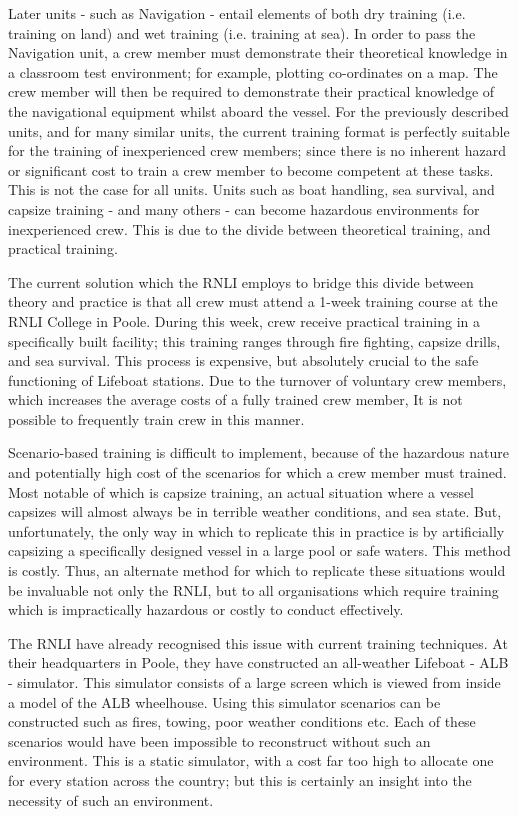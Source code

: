 \documentclass[ %
                    author={Elis Jones},
                supervisor={Dr. Kirsten Cater},
                    degree={BSc},
                     title={The Effect of Presentation Medium on Spatial Cognition},
                  subtitle={in the Virtual Environment},
                      year={2018} ]{dissertation}
\begin{document}
Later units - such as Navigation - entail elements of both dry training (i.e. training on land) and wet training (i.e. training at sea). In order to pass the Navigation unit, a crew member must demonstrate their theoretical knowledge in a classroom test environment; for example, plotting co-ordinates on a map. The crew member will then be required to demonstrate their practical knowledge of the navigational equipment whilst aboard the vessel. 
For the previously described units, and for many similar units, the current training format is perfectly suitable for the training of inexperienced crew members; since there is no inherent hazard or significant cost to train a crew member to become competent at these tasks. This is not the case for all units. Units such as boat handling, sea survival, and capsize training - and many others - can become hazardous environments for inexperienced crew. This is due to the divide between theoretical training, and practical training. 

The current solution which the RNLI employs to bridge this divide between theory and practice is that all crew must attend a 1-week training course at the RNLI College in Poole. During this week, crew receive practical training in a specifically built facility; this training ranges through fire fighting, capsize drills, and sea survival. This process is expensive, but absolutely crucial to the safe functioning of Lifeboat stations. Due to the turnover of voluntary crew members, which increases the average costs of a fully trained crew member, It is not possible to frequently train crew in this manner. 

Scenario-based training is difficult to implement, because of the hazardous nature and potentially high cost of the scenarios for which a crew member must trained. Most notable of which is capsize training, an actual situation where a vessel capsizes will almost always be in terrible weather conditions, and sea state. But, unfortunately, the only way in which to replicate this in practice is by artificially capsizing a specifically designed vessel in a large pool or safe waters. This method is costly. Thus, an alternate method for which to replicate these situations would be invaluable not only the RNLI, but to all organisations which require training which is impractically hazardous or costly to conduct effectively.

The RNLI have already recognised this issue with current training techniques. At their headquarters in Poole, they have constructed an all-weather Lifeboat - ALB - simulator. This simulator consists of a large screen which is viewed from inside a model of the ALB wheelhouse. Using this simulator scenarios can be constructed such as fires, towing, poor weather conditions etc. Each of these scenarios would have been impossible to reconstruct without such an environment. This is a static simulator, with a cost far too high to allocate one for every station across the country; but this is certainly an insight into the necessity of such an environment.
\end{document}
